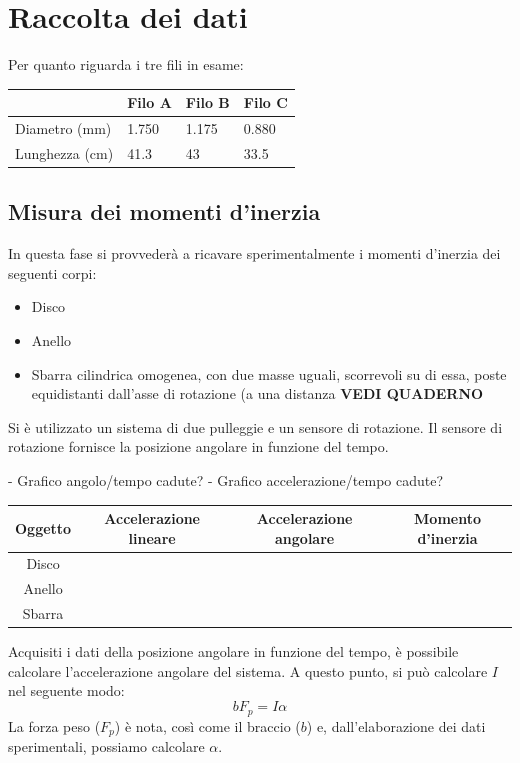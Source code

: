 \section{Raccolta dei dati}
Per quanto riguarda i tre fili in esame:
\begin{center}

\begin{tabular}{l|l|l|l}
 & Filo A & Filo B & Filo C \\
\midrule
Diametro (mm) & 1.750 & 1.175 & 0.880 \\

Lunghezza (cm) & 41.3 &  43 & 33.5 \\
\midrule
\end{tabular}\end{center}

\subsection{Misura dei momenti d'inerzia}

In questa fase si provvederà a ricavare  sperimentalmente i momenti d'inerzia dei seguenti corpi:
\begin{itemize}
\item Disco 
\item Anello
\item Sbarra cilindrica omogenea, con due masse uguali, scorrevoli su di essa, poste equidistanti dall’asse di rotazione (a una distanza \textbf{VEDI QUADERNO}
\end{itemize}

Si è utilizzato un sistema di due pulleggie e un sensore di rotazione.
Il sensore di rotazione fornisce la posizione angolare in funzione del tempo. 



- Grafico angolo/tempo cadute?
- Grafico accelerazione/tempo cadute?
\\
\begin{center}
\begin{tabular}{c|ccc}
Oggetto & Accelerazione lineare & Accelerazione angolare & Momento d'inerzia \\
\midrule
Disco & \\
Anello & \\
Sbarra &\\
\end{tabular}
\end{center}
Acquisiti i dati della posizione angolare in funzione del tempo, è possibile calcolare l'accelerazione angolare del sistema. A questo punto, si può calcolare $I$ nel seguente modo:
$$ bF_p = I\alpha $$
La forza peso ($F_p$) è nota, così come il braccio ($b$) e, dall'elaborazione dei dati sperimentali, possiamo calcolare $\alpha$.

